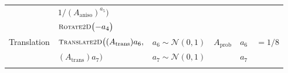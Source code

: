 {\begin{table}[t]
\begin{tabu}{|l|l|l|c|l|l|}
              & \hspace{12mm}$1/(A_\text{aniso})^{a_5}\big)$  &                                     &                   &                 &                                               \\
              & $\Rotate\big({-}a_4\big)$                     &                                     &                   &                 &                                               \\
\tabucline{-}
Translation   & $\Translate\big((A_\text{trans}) a_6,$        & $a_6 \sim \mathcal{N}(0, 1)$        & $A_\text{prob}$   & $a_6$           &  $= 1/8$       \\
              & \hspace{17mm}  $(A_\text{trans}) a_7\big)$    & $a_7 \sim \mathcal{N}(0, 1)$        &                   & $a_7$           &                                               \\
\tabucline{-}
\end{tabu}%
\end{table}%
}

\newcommand{\SB}[1]{\scalebox{0.88}{#1}}
\newcommand{\YES}{\checkmark}
\newcommand{\NO}{--}

